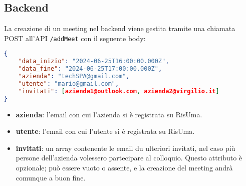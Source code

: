 \subsection{Backend}
La creazione di un meeting nel backend viene gestita tramite una chiamata POST all'API \texttt{\//addMeet} con il seguente body:
\begin{lstlisting}[language=json,firstnumber=1]
{
    "data_inizio": "2024-06-25T16:00:00.000Z", 
    "data_fine": "2024-06-25T17:00:00.000Z",   
    "azienda": "techSPA@gmail.com", 
    "utente": "mario@gmail.com",
    "invitati": [azienda1@outlook.com, azienda2@virgilio.it]
}
\end{lstlisting}
\begin{itemize}
    \item \textbf{azienda}: l'email con cui l'azienda si è registrata su RisUma.
    \item \textbf{utente}: l'email con cui l'utente si è registrata su RisUma.
    \item \textbf{invitati}: un array contenente le email du ulteriori invitati, nel caso più persone dell'azienda volessero 
    partecipare al colloquio. Questo attributo è opzionale; può essere vuoto o assente, e la creazione del meeting andrà comunque a buon fine.
\end{itemize}


